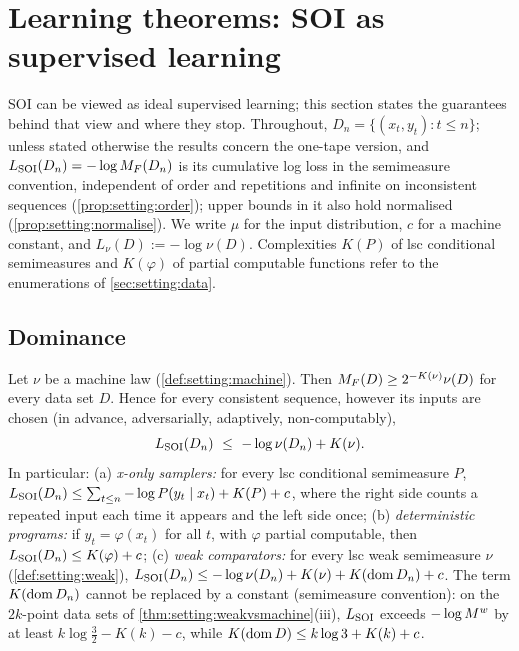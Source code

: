 \section{Learning theorems: SOI as supervised learning}\label{sec:learn}

SOI can be viewed as ideal supervised learning; this section states the guarantees behind that view and where they stop. Throughout, $D_n=\{(x_t,y_t):t\le n\}$; unless stated otherwise the results concern the one-tape version, and $L_{\mathrm{SOI}}(D_n)=-\log M_{F}(D_n)$ is its cumulative log loss in the semimeasure convention, independent of order and repetitions and infinite on inconsistent sequences (\cref{prop:setting:order}); upper bounds in it also hold normalised (\cref{prop:setting:normalise}). We write $\mu$ for the input distribution, $c$ for a machine constant, and $L_\nu(D):=-\log\nu(D)$. Complexities $K(P)$ of lsc conditional semimeasures and $K(\varphi)$ of partial computable functions refer to the enumerations of \cref{sec:setting:data}.

\subsection{Dominance}\label{sec:learn:dominance}

\begin{theorem}[dominance]\label{thm:learn:dominance}
Let $\nu$ be a machine law (\cref{def:setting:machine}). Then $M_{F}(D)\ge2^{-K(\nu)}\nu(D)$ for every data set $D$. Hence for every consistent sequence, however its inputs are chosen (in advance, adversarially, adaptively, non-computably),
\begin{equation}\label{eq:learn:dominance}
L_{\mathrm{SOI}}(D_n)\ \le\ -\log\nu(D_n)+K(\nu).
\end{equation}
In particular:
(a) \emph{x-only samplers:} for every lsc conditional semimeasure $P$, $L_{\mathrm{SOI}}(D_n)\le\sum_{t\le n}-\log P(y_t\mid x_t)+K(P)+c$, where the right side counts a repeated input each time it appears and the left side once;
(b) \emph{deterministic programs:} if $y_t=\varphi(x_t)$ for all $t$, with $\varphi$ partial computable, then $L_{\mathrm{SOI}}(D_n)\le K(\varphi)+c$;
(c) \emph{weak comparators:} for every lsc weak semimeasure $\nu$ (\cref{def:setting:weak}), $L_{\mathrm{SOI}}(D_n)\le-\log\nu(D_n)+K(\nu)+K(\operatorname{dom} D_n)+c$. The term $K(\operatorname{dom} D_n)$ cannot be replaced by a constant (semimeasure convention): on the $2k$-point data sets of \cref{thm:setting:weakvsmachine}(iii), $L_{\mathrm{SOI}}$ exceeds $-\log M^{w}$ by at least $k\log\frac32-K(k)-c$, while $K(\operatorname{dom} D)\le k\log3+K(k)+c$.
\end{theorem}

